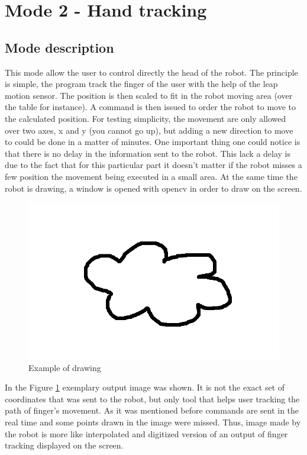 \section{Mode 2 - Hand tracking}

\subsection{Mode description}

This mode allow the user to control directly the head of the robot. The principle is simple, the program track the finger of the user with the help of the leap motion sensor. The position is then scaled to fit in the robot moving area (over the table for instance). A command is then issued to order the robot to move to the calculated position. For testing simplicity, the movement are only allowed over two axes, x and y (you cannot go up), but adding a new direction to move to could be done in a matter of minutes.
One important thing one could notice is that there is no delay in the information sent to the robot. This lack a delay is due to the fact that for this particular part it doesn't matter if the robot misses a few position the movement being executed in a small area.
At the same time the robot is drawing, a window is opened with opencv in order to draw on the screen.

\begin{figure}[H]
	\includegraphics[scale = 0.5]{cloud}
	\centering
	\caption{Example of drawing}
	\label{fig:cloud}
\end{figure}

In the Figure \ref{fig:cloud} exemplary output image was shown. It is not the exact set of coordinates that was sent to the robot, but only tool that helps user tracking the path of finger's movement. As it was mentioned before commands are sent in the real time and some points drawn in the image were missed. Thus, image made by the robot is more like interpolated and digitized version of an output of finger tracking displayed on the screen.

